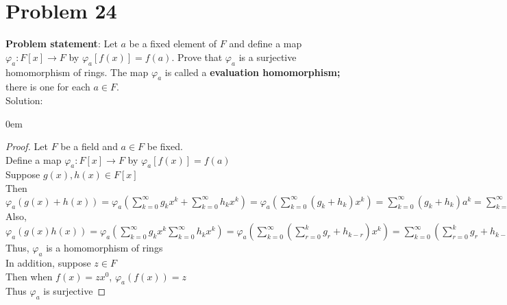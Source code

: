 \documentclass{article} %
\begin{document}
\newpage

\section*{Problem 24}


\textbf{Problem statement}: Let $a$ be a fixed element of $F$ and define a map $\varphi_a:F[x] \rightarrow F$ by $\varphi_a[f(x)] = f(a)$.  Prove that $\varphi_a$ is a surjective homomorphism of rings.  The map $\varphi_a$ is called a \textbf{evaluation homomorphism;} there is one for each $a \in F$.
\\

Solution: 
\begin{addmargin}[1em]{0em}
\begin{proof}
Let $F$ be a field and $a \in F$ be fixed.
\\Define a map $\varphi_a: F[x] \rightarrow F$ by $\varphi_a[f(x)] = f(a)$
\\Suppose $g(x), h(x) \in F[x]$
\\Then $\varphi_a(g(x) + h(x)) = \varphi_a(\sum_{k=0}^{\infty}{g_kx^k} + \sum_{k=0}^{\infty}{h_kx^k}) = \varphi_a(\sum_{k=0}^{\infty}{(g_k + h_k)x^k}) = \sum_{k=0}^{\infty}{(g_k + h_k)a^k} = \sum_{k=0}^{\infty}{g_ka^k} + \sum_{k=0}^{\infty}{h_ka^k} = \varphi_a(g(x)) + \varphi_a(h(x))$
\\Also, $\varphi_a(g(x)h(x)) = \varphi_a(\sum_{k=0}^{\infty}{g_kx^k} \sum_{k=0}^{\infty}{h_kx^k}) = \varphi_a(\sum_{k=0}^{\infty}{(\sum_{r=0}^{k}{g_r+h_{k-r}})x^k}) = \sum_{k=0}^{\infty}{(\sum_{r=0}^{k}{g_r+h_{k-r}})a^k} = \sum_{k=0}^{\infty}{g_ka^k} \sum_{k=0}^{\infty}{h_ka^k} = \varphi_a(g(x)) \varphi_a(h(x))$
\\Thus, $\varphi_a$ is a homomorphism of rings
\\In addition, suppose $z \in F$
\\Then when $f(x) = zx^0$, $\varphi_a(f(x)) = z$
\\Thus $\varphi_a$ is surjective
\end{proof}
\end{addmargin}

\end{document}
